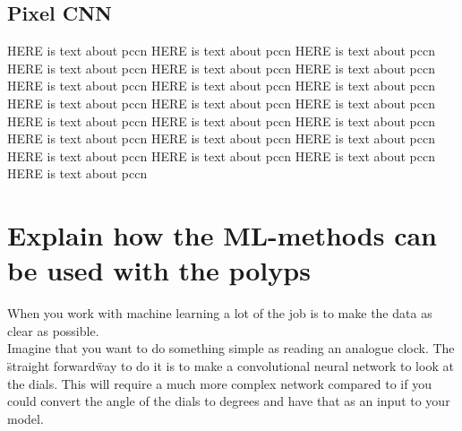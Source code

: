     
    \subsection{Pixel CNN}
      HERE is text about pccn
      HERE is text about pccn
      HERE is text about pccn
      HERE is text about pccn
      HERE is text about pccn
      HERE is text about pccn
      HERE is text about pccn
      HERE is text about pccn
      HERE is text about pccn
      HERE is text about pccn
      HERE is text about pccn
      HERE is text about pccn
      HERE is text about pccn
      HERE is text about pccn
      HERE is text about pccn
      HERE is text about pccn
      HERE is text about pccn
      HERE is text about pccn
      HERE is text about pccn
      HERE is text about pccn
      HERE is text about pccn
      HERE is text about pccn
    


	  

	  
	  

	    
	  
\section{Explain how the ML-methods can be used with the polyps}
	When you work with machine learning a lot of the job is to make the data as clear as possible. \\
	Imagine that you want to do something simple as reading an analogue clock. The \"straight forward\" way to do it is to  
	make a convolutional neural network to look at the dials. This will require a much more complex network compared to if you could convert the angle of the dials
	to degrees and have that as an input to your model.


